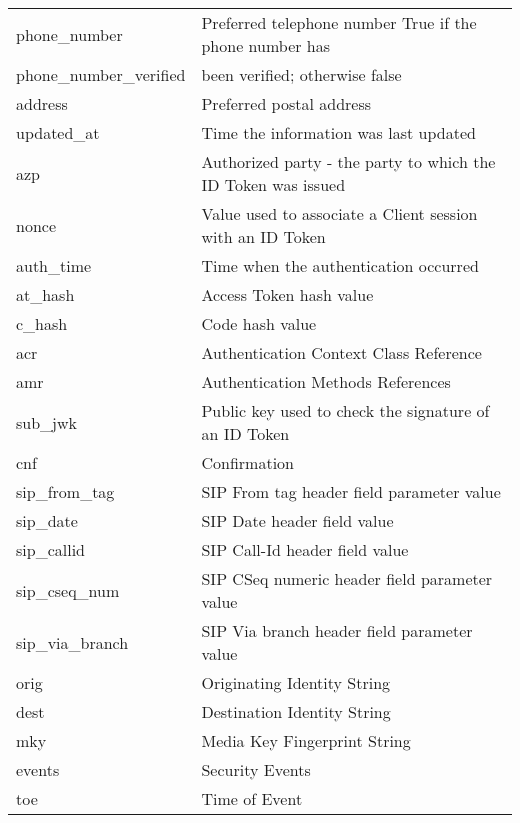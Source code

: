 \documentclass[11pt]{style}
\begin{document}
{\begin{longtable}{||l|l|}
        phone\_number              & Preferred telephone number True if the phone number has\\
        phone\_number\_verified     & been verified; otherwise false\\
        address                   & Preferred postal address\\
        updated\_at                & Time the information was last updated\\
        azp                       & Authorized party - the party to which the ID Token was issued\\
        nonce                     & Value used to associate a Client session with an ID Token\\
        auth\_time                 & Time when the authentication occurred\\
        at\_hash                   & Access Token hash value\\
        c\_hash                    & Code hash value\\
        acr                       & Authentication Context Class Reference\\
        amr                       & Authentication Methods References\\
        sub\_jwk                   & Public key used to check the signature of an ID Token\\
        cnf                       & Confirmation\\
        sip\_from\_tag              & SIP From tag header field parameter value\\
        sip\_date                  & SIP Date header field value\\
        sip\_callid                & SIP Call-Id header field value\\
        sip\_cseq\_num              & SIP CSeq numeric header field parameter value\\
        sip\_via\_branch            & SIP Via branch header field parameter value\\
        orig                      & Originating Identity String\\
        dest                      & Destination Identity String\\
        mky                       & Media Key Fingerprint String\\
        events                    & Security Events\\
        toe                       & Time of Event\\

\end{longtable}}
\end{document}
